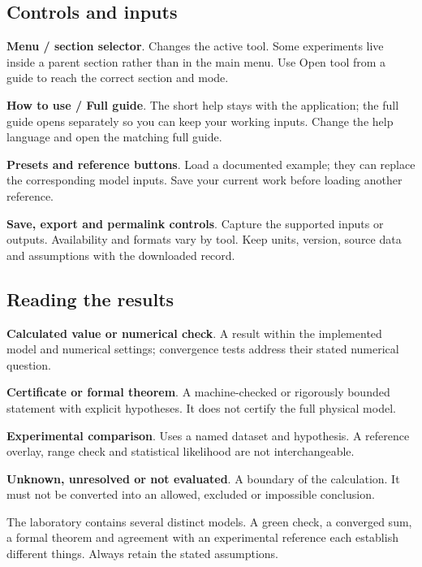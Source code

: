 \documentclass[11pt,a4paper]{article}
\begin{document}
\subsection*{Controls and inputs}
\textbf{Menu / section selector}. Changes the active tool. Some experiments live inside a parent section rather than in the main menu. Use Open tool from a guide to reach the correct section and mode.

\textbf{How to use / Full guide}. The short help stays with the application; the full guide opens separately so you can keep your working inputs. Change the help language and open the matching full guide.

\textbf{Presets and reference buttons}. Load a documented example; they can replace the corresponding model inputs. Save your current work before loading another reference.

\textbf{Save, export and permalink controls}. Capture the supported inputs or outputs. Availability and formats vary by tool. Keep units, version, source data and assumptions with the downloaded record.

\subsection*{Reading the results}
\textbf{Calculated value or numerical check}. A result within the implemented model and numerical settings; convergence tests address their stated numerical question.

\textbf{Certificate or formal theorem}. A machine-checked or rigorously bounded statement with explicit hypotheses. It does not certify the full physical model.

\textbf{Experimental comparison}. Uses a named dataset and hypothesis. A reference overlay, range check and statistical likelihood are not interchangeable.

\textbf{Unknown, unresolved or not evaluated}. A boundary of the calculation. It must not be converted into an allowed, excluded or impossible conclusion.

The laboratory contains several distinct models. A green check, a converged sum, a formal theorem and agreement with an experimental reference each establish different things. Always retain the stated assumptions.
\end{document}
